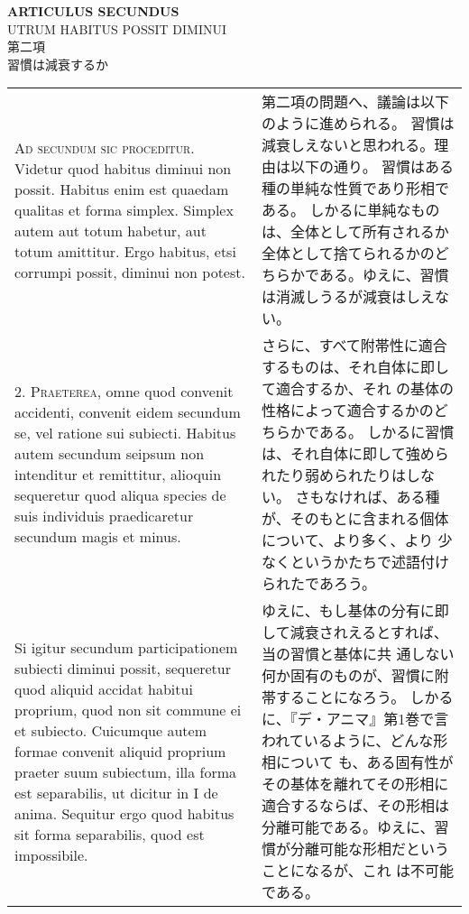 \documentclass[10pt]{jsarticle} %
\begin{document}
\newpage



\begin{center}
{\Large {\bf ARTICULUS SECUNDUS}}\\
{\large UTRUM HABITUS POSSIT DIMINUI}\\
{\Large 第二項\\習慣は減衰するか}
\end{center}

\begin{longtable}{p{21em}p{21em}}

{\scshape Ad secundum sic proceditur}. Videtur quod habitus diminui non
possit. Habitus enim est quaedam qualitas et forma simplex. Simplex
autem aut totum habetur, aut totum amittitur. Ergo habitus, etsi
corrumpi possit, diminui non potest.

&

第二項の問題へ、議論は以下のように進められる。
習慣は減衰しえないと思われる。理由は以下の通り。
習慣はある種の単純な性質であり形相である。
しかるに単純なものは、全体として所有されるか全体として捨てられるかのど
 ちらかである。ゆえに、習慣は消滅しうるが減衰はしえない。


\\



2. {\scshape Praeterea}, omne quod convenit accidenti, convenit eidem secundum se,
vel ratione sui subiecti. Habitus autem secundum seipsum non
intenditur et remittitur, alioquin sequeretur quod aliqua species de
suis individuis praedicaretur secundum magis et minus. 

&

さらに、すべて附帯性に適合するものは、それ自体に即して適合するか、それ
 の基体の性格によって適合するかのどちらかである。
しかるに習慣は、それ自体に即して強められたり弱められたりはしない。
さもなければ、ある種が、そのもとに含まれる個体について、より多く、より
 少なくというかたちで述語付けられたであろう。

\\


Si igitur
secundum participationem subiecti diminui possit, sequeretur quod
aliquid accidat habitui proprium, quod non sit commune ei et
subiecto. Cuicumque autem formae convenit aliquid proprium praeter
suum subiectum, illa forma est separabilis, ut dicitur in I de
anima. Sequitur ergo quod habitus sit forma separabilis, quod est
impossibile.

&

ゆえに、もし基体の分有に即して減衰されえるとすれば、当の習慣と基体に共
 通しない何か固有のものが、習慣に附帯することになろう。
しかるに、『デ・アニマ』第1巻で言われているように、どんな形相について
 も、ある固有性がその基体を離れてその形相に適合するならば、その形相は
 分離可能である。ゆえに、習慣が分離可能な形相だということになるが、これ
 は不可能である。


\end{longtable}
\end{document}
